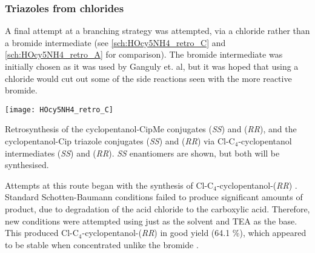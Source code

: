 \subsubsection{Triazoles from chlorides\label{sec:Cl4Cl}}

A final attempt at a branching strategy was attempted, via a chloride rather than a bromide intermediate (see \ref{sch:HOcy5NH4_retro_C} and \ref{sch:HOcy5NH4_retro_A} for comparison). The bromide intermediate was initially chosen as it was used by Ganguly et. al\cite{Ganguly2011}, but it was hoped that using a chloride would cut out some of the side reactions seen with the more reactive bromide.

\begin{scheme}[H]
	\begin{center}
		\texttt{[image: HOcy5NH4\_retro\_C]}
		\caption{Retrosynthesis of the cyclopentanol-CipMe conjugates 
		 (\textit{SS}) and
		 (\textit{RR}), 
		and the cyclopentanol-Cip triazole conjugates 
		 (\textit{SS}) and
		 (\textit{RR})  
		via Cl-C$_4$-cyclopentanol intermediates 
		 (\textit{SS}) and 
		 (\textit{RR}). 
		\textit{SS} enantiomers are shown, but both will be synthesised.
		\label{sch:HOcy5NH4_retro_C}}
	\end{center}
\end{scheme}

Attempts at this route began with the synthesis of Cl-C$_4$-cyclopentanol-(\textit{RR}) . Standard Schotten-Baumann conditions failed to produce significant amounts of product, due to degradation of the acid chloride to the carboxylic acid. 
Therefore, new conditions were attempted using just  as the solvent and TEA as the base. This produced Cl-C$_4$-cyclopentanol-(\textit{RR})  in good yield (64.1 \%), which appeared to be stable when concentrated unlike the bromide .



